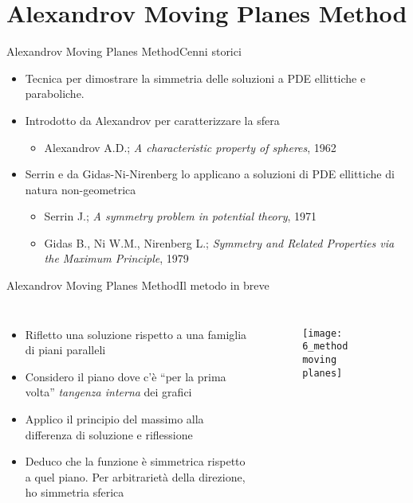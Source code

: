 \section{Alexandrov Moving Planes Method}
\begin{frame}{Alexandrov Moving Planes Method}{Cenni storici}
	\begin{itemize}
		\item Tecnica per dimostrare la simmetria delle soluzioni a PDE ellittiche e paraboliche. 
		\item<2-> Introdotto da Alexandrov per caratterizzare la sfera 
		\begin{itemize}
			\item Alexandrov A.D.; \textit{A characteristic property of spheres}, 1962
		\end{itemize}
		\item<3-> Serrin e da Gidas-Ni-Nirenberg lo applicano a soluzioni di PDE ellittiche di natura non-geometrica
		\begin{itemize}
			\item Serrin J.; \textit{A symmetry problem in potential theory}, 1971
			\item Gidas B., Ni W.M., Nirenberg L.; \textit{Symmetry and Related Properties via the Maximum Principle}, 1979
		\end{itemize}
	\end{itemize}
\end{frame}

\begin{frame}{Alexandrov Moving Planes Method}{Il metodo in breve}
	\begin{columns}
		\begin{itemize}
			\item Rifletto una soluzione rispetto a una famiglia di piani paralleli
			\item<2-> Considero il piano dove c'è ``per la prima volta'' \textit{tangenza interna} dei grafici
			\item<3-> Applico il principio del massimo alla differenza di soluzione e riflessione
			\item<4-> Deduco che la funzione è simmetrica rispetto a quel piano. Per arbitrarietà della direzione, ho simmetria sferica
		\end{itemize}
		\begin{figure}
			\begin{center}
				\texttt{[image: 6\_method moving planes]}
				\caption{}
			\end{center}
		\end{figure}
	\end{columns}
\end{frame}

